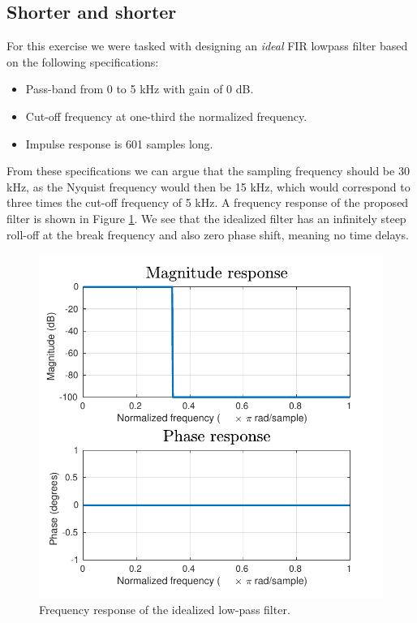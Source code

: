 \documentclass[journal]{IEEEtran}
\begin{document}
\subsection{Shorter and shorter}
For this exercise we were tasked with designing an \textit{ideal} FIR lowpass filter based on the following specifications: 
\begin{itemize}
    \item Pass-band from 0 to 5 kHz with gain of 0 dB. 
    \item Cut-off frequency at one-third the normalized frequency. 
    \item Impulse response is 601 samples long. 
\end{itemize}
From these specifications we can argue that the sampling frequency should be 30 kHz, as the Nyquist frequency would then be 15 kHz, which would correspond to three times the cut-off frequency of 5 kHz. A frequency response of the proposed filter is shown in Figure \ref{fig:freq_resp_lowpass}. We see that the idealized filter has an infinitely steep roll-off at the break frequency and also zero phase shift, meaning no time delays. 
\begin{figure}[H]
    \centering
    \includegraphics[width=\columnwidth,clip]{assignment_02/plots/freq_resp_lowpass_fir.pdf}
    \caption{Frequency response of the idealized low-pass filter.}
    \label{fig:freq_resp_lowpass}
\end{figure}
\end{document}
